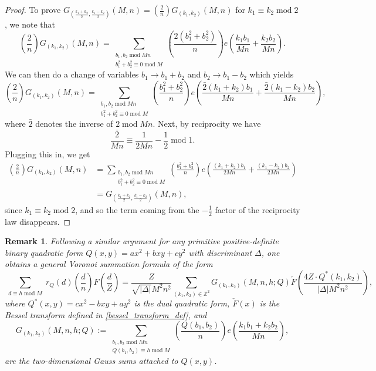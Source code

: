 \documentclass[12pt]{amsart}
\def\Z{\mathbb{Z}}
\newtheorem{remark}[theorem]{Remark}
\def\Z{\mathbb Z}
\def\Z{\mathbb Z}
\def\mod{\operatorname{mod}}
\begin{document}
\begin{proof}
    To prove $G_{\left(\frac{k_1+k_2}{2},\frac{k_1-k_2}{2}\right)}(M,n) = \left(\frac{2}{n}\right) G_{(k_1,k_2)}(M, n)$ for $k_1\equiv k_2 \mod 2$, we note that
$$ \left( \frac{2}{n}\right) G_{(k_1,k_2)}(M, n) = \sum_{\substack{b_1,b_2 \mod Mn \\ b_1^2+b_2^2\equiv 0 \mod M}} \left( \frac{2(b_1^2+b_2^2)}{n}\right)  e\left( \frac{k_1b_1}{Mn} + \frac{k_2 b_2}{Mn} \right) .$$
We can then do a change of variables $b_1 \to b_1+b_2$ and $b_2 \to b_1 - b_2$ which yields 
$$ \left( \frac{2}{n}\right) G_{(k_1,k_2)}(M, n) = \sum_{\substack{b_1,b_2 \mod Mn \\ b_1^2+b_2^2\equiv 0 \mod M}} \left( \frac{b_1^2+b_2^2}{n}\right)  e\left( \frac{\bar{2}(k_1+k_2)b_1}{Mn} + \frac{\bar{2}(k_1-k_2) b_2}{Mn} \right), $$
where $\bar{2}$ denotes the inverse of $2 \mod Mn$. 
Next, by reciprocity we have
$$ \frac{\bar{2}}{Mn} \equiv \frac{1}{2Mn} - \frac{1}{2} \mod 1. $$
Plugging this in, we get
\begin{align*}
\left( \frac{2}{n}\right) G_{(k_1,k_2)}(M, n) &= \sum_{\substack{b_1,b_2 \mod Mn \\ b_1^2+b_2^2\equiv 0 \mod M}} \left( \frac{b_1^2+b_2^2}{n}\right)  e\left( \frac{(k_1+k_2)b_1}{2Mn} + \frac{(k_1-k_2) b_2}{2Mn} \right) \\
&= G_{\left(\frac{k_1+k_2}{2},\frac{k_1-k_2}{2}\right)}(M, n),
\end{align*}
since $k_1\equiv k_2 \mod 2$, and so the term coming from the $-\frac{1}{2}$ factor of the reciprocity law disappears.
\end{proof}

\begin{remark}\label{remark_general_quad_forms}
Following a similar argument for any primitive positive-definite binary quadratic form $Q(x,y)=ax^2+bxy+cy^2$ with discriminant $\Delta$, one obtains a general Voronoi summation formula of the form
    $$  \sum_{\substack{d\equiv h \mod M}} r_Q(d) \left( \frac{d}{n} \right) F\left( \frac{d}{Z} \right) = \frac{Z}{\sqrt{|\Delta|}M^2n^2} \sum_{(k_1,k_2)\in \Z^2} G_{(k_1,k_2)}(M, n, h; Q) \check{F}\left( \frac{4Z\cdot Q^*(k_1,k_2)}{|\Delta|M^2n^2} \right) , $$
    where $Q^*(x,y) = cx^2-bxy+ay^2$ is the dual quadratic form, $\check{F}(x)$ is the Bessel transform defined in \eqref{bessel_transform_def}, and 
    $$ G_{(k_1,k_2)}(M, n, h ; Q) := \sum_{\substack{b_1, b_2 \mod M n\\ Q(b_1,b_2) \equiv h \mod M}} \left( \frac{Q(b_1,b_2)}{n} \right) e\left( \frac{k_1 b_1 + k_2 b_2}{Mn} \right),$$
    are the two-dimensional Gauss sums attached to $Q(x,y)$.
    \end{remark}
\end{document}
